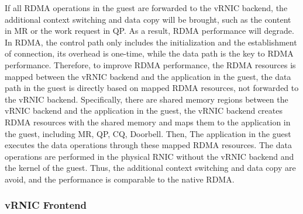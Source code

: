 If all RDMA operations in the guest are forwarded to the vRNIC backend, the additional context switching and data copy will be brought, such as the content in MR or the work request in QP. As a result, RDMA performance will degrade. In RDMA, the control path only includes the initialization and the establishment of connection, its overhead is one-time, while the data path is the key to RDMA performance. Therefore, to improve RDMA performance, the RDMA resources is mapped between the vRNIC backend and the application in the guest, the data path in the guest is directly based on mapped RDMA resources, not forwarded to the vRNIC backend. Specifically, there are shared memory regions between the vRNIC backend and the application in the guest, the vRNIC backend creates RDMA resources with the shared memory and maps them to the application in the guest, including MR, QP, CQ, Doorbell. Then, The application in the guest executes the data operations through these mapped RDMA resources. The data operations are performed in the physical RNIC without the vRNIC backend and the kernel of the guest. Thus, the additional context switching and data copy are avoid, and the performance is comparable to the native RDMA.

\subsubsection{vRNIC Frontend}

